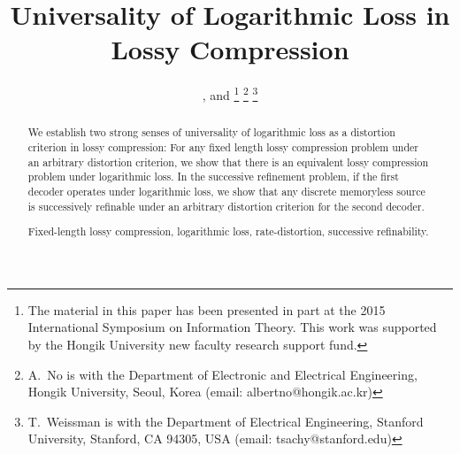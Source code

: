 \documentclass[draftclsnofoot, onecolumn, letterpaper, romanappendices]{IEEEtran}
\begin{document}
\title{Universality of Logarithmic Loss in Lossy Compression}

\author{,
and 
\thanks{The material in this paper has been presented in part at the 2015 International
Symposium on Information Theory.
This work was supported by the Hongik University new faculty research support fund.}
\thanks{A.\ No is with the Department of Electronic and Electrical Engineering,
Hongik University, Seoul, Korea (email: albertno@hongik.ac.kr)}
\thanks{T.\ Weissman is with the Department of Electrical Engineering, Stanford University,
Stanford, CA 94305, USA (email: tsachy@stanford.edu)}
}

\maketitle







\begin{abstract}
We establish two strong senses of universality of logarithmic loss as a
distortion criterion in lossy compression: For any fixed length lossy
compression problem under an arbitrary distortion criterion,
we show that there is an equivalent lossy compression problem under logarithmic loss.
In the successive refinement problem, if the first decoder operates under logarithmic loss,
we show that any discrete memoryless source is successively refinable under an
arbitrary distortion criterion for the second decoder.

\begin{IEEEkeywords}
Fixed-length lossy compression, logarithmic loss, rate-distortion, successive refinability.
\end{IEEEkeywords}
\end{abstract}
\IEEEpeerreviewmaketitle
\end{document}
